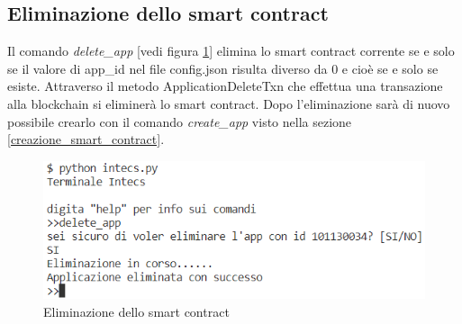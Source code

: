 \subsection{Eliminazione dello smart contract}
Il comando \textit{delete\_app} [vedi figura \ref{fig: intecs_delete_smart_contract}] elimina lo smart contract corrente se e solo se il valore di app\_id nel file config.json risulta diverso da 0 e cioè se e solo se esiste. Attraverso il metodo ApplicationDeleteTxn che effettua una transazione alla blockchain si eliminerà lo smart contract. Dopo l'eliminazione sarà di nuovo possibile crearlo con il comando \textit{create\_app} visto nella sezione \ref{creazione_smart_contract}.
\begin{figure}[!h]
\flushleft
\includegraphics[scale=0.8]{images/Intecs/eliminazione_app.png}
\caption{Eliminazione dello smart contract}
\label{fig: intecs_delete_smart_contract}
\end{figure}


